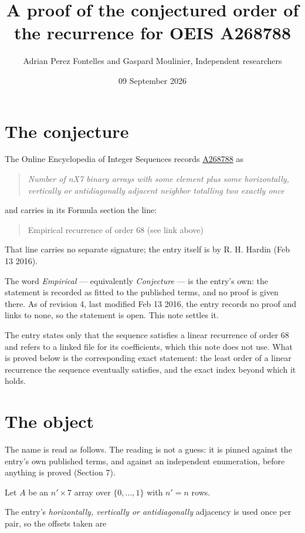 \documentclass[11pt]{article}
\title{A proof of the conjectured order of the recurrence for OEIS A268788}
\author{Adrian Perez Fontelles and Gaspard Moulinier, Independent researchers}
\date{09 September 2026}
\theoremstyle{definition}
\begin{document}
\maketitle
\section{The conjecture}

The Online Encyclopedia of Integer Sequences records \href{https://oeis.org/A268788}{A268788} as

\begin{quote}\itshape Number of nX7 binary arrays with some element plus some horizontally, vertically or antidiagonally adjacent neighbor totalling two exactly once\end{quote}

and carries in its Formula section the line:

\begin{quote}\ttfamily Empirical recurrence of order 68 (see link above)\end{quote}

That line carries no separate signature; the entry itself is by R. H. Hardin (Feb 13 2016).

The word {\itshape Empirical} --- equivalently {\itshape Conjecture} --- is the entry's own: the statement is recorded as fitted to the published terms, and no proof is given there. As of revision 4, last modified Feb 13 2016, the entry records no proof and links to none, so the statement is open. This note settles it.

The entry states only that the sequence satisfies a linear recurrence of order $68$ and refers to a linked file for its coefficients, which this note does not use. What is proved below is the corresponding exact statement: the least order of a linear recurrence the sequence eventually satisfies, and the exact index beyond which it holds.

\section{The object}

The name is read as follows. The reading is not a guess: it is pinned against the entry's own published terms, and against an independent enumeration, before anything is proved (Section 7).

Let $A$ be an $n' \times 7$ array over $\{0,\dots,1\}$ with $n' = n$ rows.

The entry's {\itshape horizontally, vertically or antidiagonally} adjacency is used once per pair, so the offsets taken are
\end{document}
